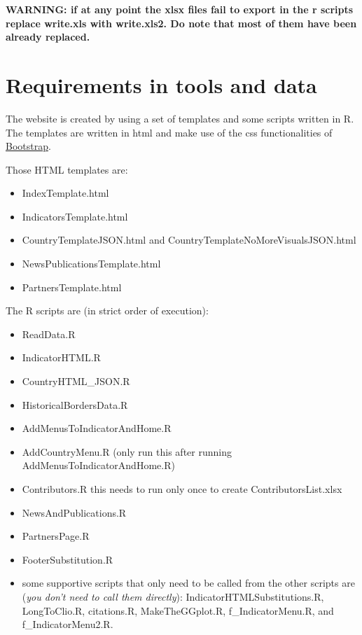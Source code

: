 \documentclass[a4paper]{article}
\begin{document}
\textbf{WARNING: if at any point the xlsx files fail to export in the r scripts 
replace write.xls with write.xls2. Do note that most of them have been already 
replaced.}

\clearpage

\section{Requirements in tools and data}\label{sec:req}

The website is created by using a set of templates and some scripts written in 
R. The templates are written in html and make use of the css functionalities of 
\href{http://getbootstrap.com/}{Bootstrap}. 

Those HTML templates are:
\begin{itemize}
 \item IndexTemplate.html
 \item IndicatorsTemplate.html
 \item CountryTemplateJSON.html and CountryTemplateNoMoreVisualsJSON.html
 \item NewsPublicationsTemplate.html
 \item PartnersTemplate.html
\end{itemize}

The R scripts are (in strict order of execution):
\begin{itemize}
 \item ReadData.R
 \item IndicatorHTML.R
 \item CountryHTML\_JSON.R
 \item HistoricalBordersData.R
 \item AddMenusToIndicatorAndHome.R
 \item AddCountryMenu.R (only run this after running 
AddMenusToIndicatorAndHome.R)
 \item Contributors.R this needs to run only once to create 
ContributorsList.xlsx
 \item NewsAndPublications.R
 \item PartnersPage.R
 \item FooterSubstitution.R
 \item some supportive scripts that only need to be called from the other 
scripts are (\textit{you don't need to call them directly}): 
IndicatorHTMLSubstitutions.R, LongToClio.R, citations.R, MakeTheGGplot.R, 
f\_IndicatorMenu.R, and f\_IndicatorMenu2.R.
\end{itemize}
\end{document}
